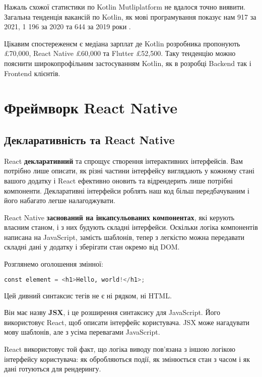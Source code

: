 Нажаль схожої статистики по Kotlin Mutliplatform не вдалося точно виявити.
Загальна тенденція вакансій по Kotlin, як мові програмування показує нам 917 за 2021, 1 196 за 2020 та 644 за 2019 роки \cite{kotlin_jobs}.

Цікавим спостереженєм є медіана зарплат де Kotlin розробника пропонують £70,000\cite{kotlin_jobs}, React Native £60,000\cite{react_native_jobs} та Flutter £52,500\cite{flutter_jobs}.
Таку тенденцію можно пояснити широкопрофільним застосуванням Kotlin, як в розробці Backend так і Frontend клієнтів.


\section{Фреймворк React Native}
\label{sec:rn}

\subsection{Декларативність та React Native}
\label{subsec:rn_declarative}

React \textbf{декларативний} та спрощує створення інтерактивних інтерфейсів.
Вам потрібно лише описати, як різні частини інтерфейсу виглядають у кожному стані вашого додатку і React ефективно оновить та відрендерить лише потрібні компоненти.
Декларативні інтерфейси роблять наш код більш передбачуваним і його набагато легше налагоджувати.

React Native \textbf{заснований на інкапсульованих компонентах}, які керують власним станом, і з них будують складні інтерфейси.
Оскільки логіка компонентів написана на JavaScript, замість шаблонів,
тепер з легкістю можна передавати складні дані у додатку і зберігати стан окремо від DOM.

Розглянемо оголошення змінної:
\begin{lstlisting}[style=light, language=Python,label={lst:jsx_hello},caption=JSX Hello World]
const element = <h1>Hello, world!</h1>;
\end{lstlisting}

Цей дивний синтаксис тегів не є ні рядком, ні HTML.

Він має назву \textbf{JSX}, і це розширення синтаксису для JavaScript.
Його використовує React, щоб описати інтерфейс користувача.
JSX може нагадувати мову шаблонів, але з усіма перевагами JavaScript.

React використовує той факт, що логіка виводу пов’язана з іншою логікою інтерфейсу користувача: як обробляються події, як змінюється стан з часом і як дані готуються для рендерингу.

